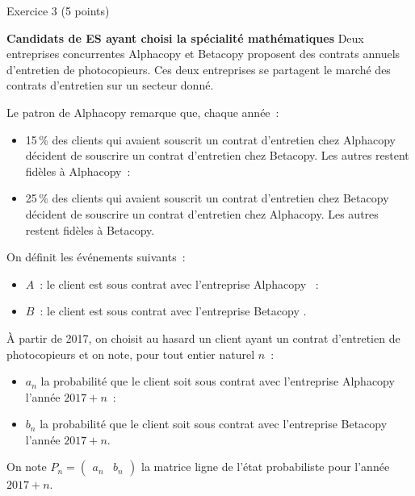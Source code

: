 
\begin{h2}Exercice 3 (5 points)\end{h2}
\textbf{Candidats de ES ayant choisi la spécialité \og mathématiques \fg{}}
\medskip
Deux entreprises concurrentes \og Alphacopy \fg{} et \og Betacopy \fg{} proposent des contrats annuels d'entretien de photocopieurs. Ces deux entreprises se partagent le marché des contrats d'entretien sur un secteur donné.
\par
\smallskip
\par
Le patron de Alphacopy remarque que, chaque année~:
\begin{itemize}
     \item 15\,\% des clients qui avaient souscrit un contrat d'entretien chez Alphacopy décident de souscrire un contrat d'entretien chez Betacopy. Les autres restent fidèles à Alphacopy~:
     \item 25\,\% des clients qui avaient souscrit un contrat d'entretien chez Betacopy décident de souscrire un contrat d'entretien chez Alphacopy. Les autres restent fidèles à Betacopy.
\end{itemize}
\smallskip
\par
On définit les événements suivants~:
\begin{itemize}
     \item $A$~: \og le client est sous contrat avec  l'entreprise Alphacopy \fg{}~:
     \item $B$~: \og le client est sous contrat avec l'entreprise Betacopy \fg{}.
\end{itemize}
\smallskip
\par
À partir de 2017, on choisit au hasard un client ayant un contrat d'entretien de photocopieurs et on note, pour tout entier naturel $n$~:
\par
\smallskip
\par
\begin{itemize}
     \item $a_n$ la probabilité que le client soit sous contrat avec l'entreprise Alphacopy l'année $2017+n$~:
     \item $b_n$ la probabilité que le client soit sous contrat avec l'entreprise Betacopy l'année $2017+ n$.
\end{itemize}
On note $P_n=\begin{pmatrix} a_n & b_n\end{pmatrix}$ la matrice ligne de l'état probabiliste pour l'année $2017+n$.
\par
\smallskip
\par
